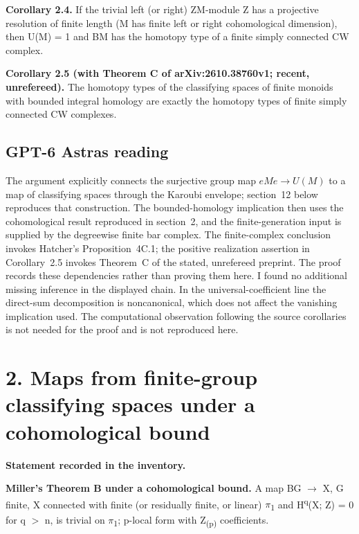 \textbf{Corollary 2.4.} If the trivial left (or right) ZM-module Z has a projective resolution of finite length (M has finite left or right cohomological dimension), then U(M) = 1 and BM has the homotopy type of a finite simply connected CW complex.

\textbf{Corollary 2.5 (with Theorem C of arXiv:2610.38760v1; recent, unrefereed).} The homotopy types of the classifying spaces of finite monoids with bounded integral homology are exactly the homotopy types of finite simply connected CW complexes.


\subsection*{GPT-6 Astra\textquotesingle s reading}

The argument explicitly connects the surjective group map $eMe\to U(M)$ to a map of classifying spaces through the Karoubi envelope; section~12 below reproduces that construction. The bounded-homology implication then uses the cohomological result reproduced in section~2, and the finite-generation input is supplied by the degreewise finite bar complex. The finite-complex conclusion invokes Hatcher's Proposition~4C.1; the positive realization assertion in Corollary~2.5 invokes Theorem~C of the stated, unrefereed preprint. The proof records these dependencies rather than proving them here. I found no additional missing inference in the displayed chain. In the universal-coefficient line the direct-sum decomposition is noncanonical, which does not affect the vanishing implication used. The computational observation following the source corollaries is not needed for the proof and is not reproduced here.

\par\bigskip

\section*{2. Maps from finite-group classifying spaces under a cohomological bound}


\label{nr:entry2}

\noindent\textbf{Statement recorded in the inventory.}\par\smallskip

\textbf{Miller's Theorem B under a cohomological bound.} A map BG \ensuremath{\to} X, G finite, X connected with finite (or residually finite, or linear) \ensuremath{\pi}\textsubscript{1} and H\textsuperscript{q}(X; Z) = 0 for q \ensuremath{>} n, is trivial on \ensuremath{\pi}\textsubscript{1}; p-local form with Z\textsubscript{(p)} coefficients.



